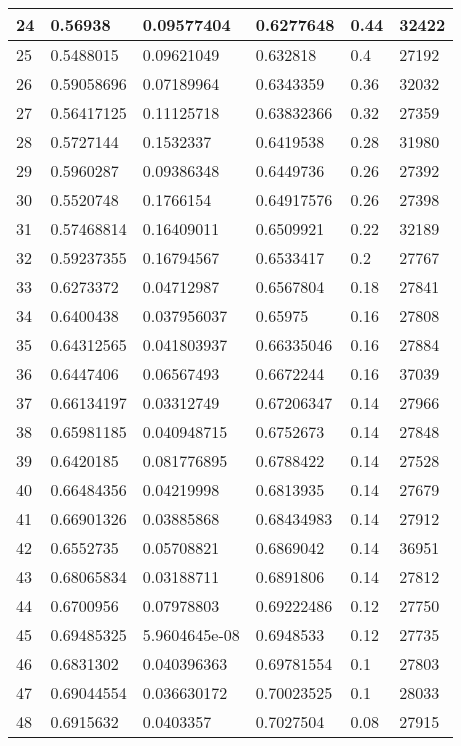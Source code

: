 \begin{longtable}{|l|l|l|l|l|l|}
24 & 0.56938 & 0.09577404 & 0.6277648 & 0.44 & 32422 \\ \hline 
25 & 0.5488015 & 0.09621049 & 0.632818 & 0.4 & 27192 \\ \hline 
26 & 0.59058696 & 0.07189964 & 0.6343359 & 0.36 & 32032 \\ \hline 
27 & 0.56417125 & 0.11125718 & 0.63832366 & 0.32 & 27359 \\ \hline 
28 & 0.5727144 & 0.1532337 & 0.6419538 & 0.28 & 31980 \\ \hline 
29 & 0.5960287 & 0.09386348 & 0.6449736 & 0.26 & 27392 \\ \hline 
30 & 0.5520748 & 0.1766154 & 0.64917576 & 0.26 & 27398 \\ \hline 
31 & 0.57468814 & 0.16409011 & 0.6509921 & 0.22 & 32189 \\ \hline 
32 & 0.59237355 & 0.16794567 & 0.6533417 & 0.2 & 27767 \\ \hline 
33 & 0.6273372 & 0.04712987 & 0.6567804 & 0.18 & 27841 \\ \hline 
34 & 0.6400438 & 0.037956037 & 0.65975 & 0.16 & 27808 \\ \hline 
35 & 0.64312565 & 0.041803937 & 0.66335046 & 0.16 & 27884 \\ \hline 
36 & 0.6447406 & 0.06567493 & 0.6672244 & 0.16 & 37039 \\ \hline 
37 & 0.66134197 & 0.03312749 & 0.67206347 & 0.14 & 27966 \\ \hline 
38 & 0.65981185 & 0.040948715 & 0.6752673 & 0.14 & 27848 \\ \hline 
39 & 0.6420185 & 0.081776895 & 0.6788422 & 0.14 & 27528 \\ \hline 
40 & 0.66484356 & 0.04219998 & 0.6813935 & 0.14 & 27679 \\ \hline 
41 & 0.66901326 & 0.03885868 & 0.68434983 & 0.14 & 27912 \\ \hline 
42 & 0.6552735 & 0.05708821 & 0.6869042 & 0.14 & 36951 \\ \hline 
43 & 0.68065834 & 0.03188711 & 0.6891806 & 0.14 & 27812 \\ \hline 
44 & 0.6700956 & 0.07978803 & 0.69222486 & 0.12 & 27750 \\ \hline 
45 & 0.69485325 & 5.9604645e-08 & 0.6948533 & 0.12 & 27735 \\ \hline 
46 & 0.6831302 & 0.040396363 & 0.69781554 & 0.1 & 27803 \\ \hline 
47 & 0.69044554 & 0.036630172 & 0.70023525 & 0.1 & 28033 \\ \hline 
48 & 0.6915632 & 0.0403357 & 0.7027504 & 0.08 & 27915 \\ \hline 

\end{longtable}
